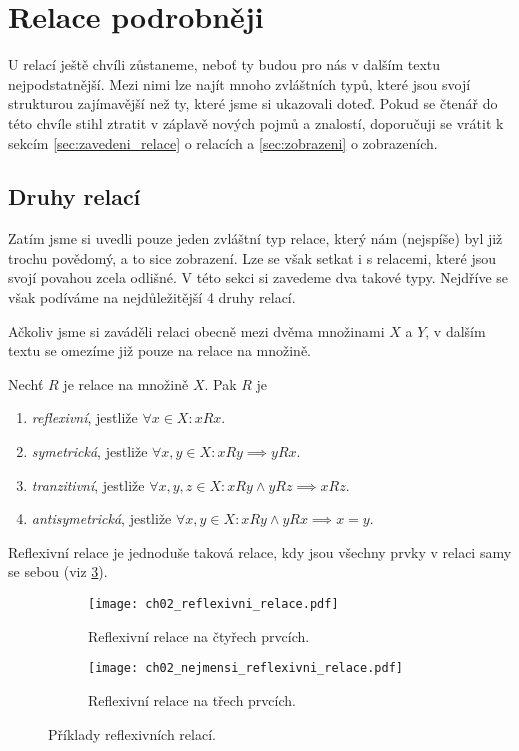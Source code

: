 \section{Relace podrobněji}\label{sec:relace_podrobneji}
U relací ještě chvíli zůstaneme, neboť ty budou pro nás v dalším textu nejpodstatnější. Mezi nimi lze najít mnoho zvláštních typů, které jsou svojí strukturou zajímavější než ty, které jsme si ukazovali doteď. Pokud se čtenář do této chvíle stihl ztratit v záplavě nových pojmů a znalostí, doporučuji se vrátit k sekcím \ref{sec:zavedeni_relace} o relacích a \ref{sec:zobrazeni} o zobrazeních.

\subsection{Druhy relací}\label{subsec:druhy_relaci}
Zatím jsme si uvedli pouze jeden zvláštní typ relace, který nám (nejspíše) byl již trochu povědomý, a to sice zobrazení. Lze se však setkat i s relacemi, které jsou svojí povahou zcela odlišné. V této sekci si zavedeme dva takové typy. Nejdříve se však podíváme na nejdůležitější 4 druhy relací.\par
Ačkoliv jsme si zaváděli relaci obecně mezi dvěma množinami $X$ a $Y$, v dalším textu se omezíme již pouze na relace na množině.
\begin{definition}\label{def:dulezite_druhy_relaci}
    Nechť $R$ je relace na množině $X$. Pak $R$ je
    \begin{enumerate}[label=(\roman*)]
        \item \emph{reflexivní}, jestliže $\forall x\in X: xRx$.
        \item \emph{symetrická}, jestliže $\forall x,y\in X: xRy \implies yRx$.
        \item \emph{tranzitivní}, jestliže $\forall x,y,z\in X: xRy \land yRz \implies xRz$.
        \item \emph{antisymetrická}, jestliže $\forall x,y\in X: xRy \land yRx \implies x=y$.
    \end{enumerate}
\end{definition}
Reflexivní relace je jednoduše taková relace, kdy jsou všechny prvky v relaci samy se sebou (viz \ref{fig:priklady_reflexivnich_relaci}).
\begin{figure}[H]
    \centering
    \begin{subfigure}{6cm}
        \centering
        \texttt{[image: ch02\_reflexivni\_relace.pdf]}
        \caption{Reflexivní relace na čtyřech prvcích.}
        \label{subfig:reflexivni_relace}
    \end{subfigure}
    \quad
    \begin{subfigure}{6cm}
        \centering
        \texttt{[image: ch02\_nejmensi\_reflexivni\_relace.pdf]}
        \caption{Reflexivní relace na třech prvcích.}
        \label{subfig:nejmensi_reflexivni_relace}
    \end{subfigure}
    \caption{Příklady reflexivních relací.}
    \label{fig:priklady_reflexivnich_relaci}
\end{figure}
